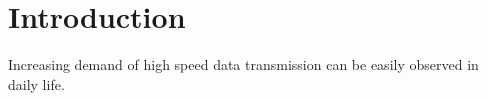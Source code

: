\chapter{Introduction}
\label{ch:Introduction}







Increasing demand of high speed data transmission can be easily observed in daily life.




